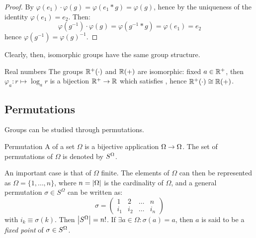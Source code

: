 \begin{proofbox}
  \begin{proof}
    By  $ \varphi(e_1) \cdot \varphi(g) = \varphi(e_1 * g) = \varphi(g) $, hence by the uniqueness of the identity $ \varphi(e_1) = e_2 $. Then:
    \begin{equation*}
      \varphi(g^{-1}) \cdot \varphi(g) = \varphi(g^{-1} * g) = \varphi(e_1) = e_2
    \end{equation*}
    hence $ \varphi(g^{-1}) = \varphi(g)^{-1} $.
  \end{proof}
\end{proofbox}

Clearly, then, isomorphic groups have the same group structure.

\begin{example}{Real numbers}{}
  The groups $ \mathbb{R}^+(\cdot) $ and $ \mathbb{R}(+) $ are isomorphic: fixed $ a \in \mathbb{R}^+ $, then $ \varphi_a : r \mapsto \log_a r $ is a bijection $ \mathbb{R}^+ \rightarrow \mathbb{R} $ which satisfies , hence $ \mathbb{R}^+(\cdot) \cong \mathbb{R}(+) $.
\end{example}

\subsection{Permutations}

Groups can be studied through permutations.

\begin{definition}{Permutation}{}
  A  of a set $ \Omega $ is a bijective application $ \Omega \rightarrow \Omega $. The set of permutations of $ \Omega $ is denoted by $ S^{\Omega} $.
\end{definition}

An important case is that of $ \Omega $ finite. The elements of $ \Omega $ can then be represented as $ \Omega = \{1 , \dots , n\} $, where $ n = \left\lvert\Omega\right\rvert $ is the cardinality of $ \Omega $, and a general permutation $ \sigma \in S^\Omega $ can be written as:
\begin{equation*}
  \sigma =
  \begin{pmatrix}
    1 & 2 & \dots & n \\
    i_1 & i_2 & \dots & i_n
  \end{pmatrix}
\end{equation*}
with $ i_k \equiv \sigma(k) $. Then $ \left\lvert S^\Omega\right\rvert = n! $. If $ \exists a \in \Omega : \sigma(a) = a $, then $ a $ is said to be a \emph{fixed point} of $ \sigma \in S^{\Omega} $.

